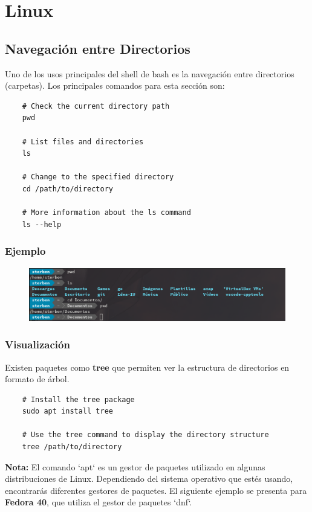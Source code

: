 \chapter{Linux}

\section{Navegación entre Directorios}
Uno de los usos principales del shell de bash es la navegación entre directorios (carpetas). Los principales comandos para esta sección son:

\begin{lstlisting}
    # Check the current directory path
    pwd

    # List files and directories
    ls

    # Change to the specified directory
    cd /path/to/directory        

    # More information about the ls command
    ls --help
\end{lstlisting}

\subsection*{Ejemplo}
\begin{figure}[h!]
    \centering
    \includegraphics[width=1\textwidth]{img/navegacion.png}
\end{figure}

\newpage

\subsection{Visualización}
Existen paquetes como \textbf{tree} que permiten ver la estructura de directorios en formato de árbol.

\begin{lstlisting}
    # Install the tree package
    sudo apt install tree

    # Use the tree command to display the directory structure
    tree /path/to/directory      
\end{lstlisting}

\textbf{Nota:} El comando `apt` es un gestor de paquetes utilizado en algunas distribuciones de Linux. Dependiendo del sistema operativo que estés usando, encontrarás diferentes gestores de paquetes. El siguiente ejemplo se presenta para \textbf{Fedora 40}, que utiliza el gestor de paquetes `dnf`.

